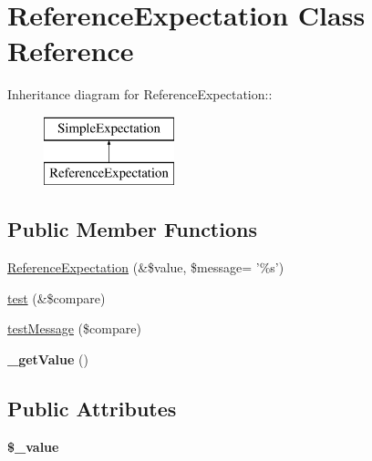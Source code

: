\hypertarget{class_reference_expectation}{
\section{ReferenceExpectation Class Reference}
\label{class_reference_expectation}
}
Inheritance diagram for ReferenceExpectation::\begin{figure}[H]
\begin{center}
\leavevmode
\includegraphics[height=2cm]{class_reference_expectation}
\end{center}
\end{figure}
\subsection*{Public Member Functions}
\begin{DoxyCompactItemize}
\item 
\hyperlink{class_reference_expectation_aa648fc5c33e580a6b661dbb85e8b5591}{ReferenceExpectation} (\&\$value, \$message= '\%s')
\item 
\hyperlink{class_reference_expectation_a919fb46086bf981f56b77c468c0bf4c4}{test} (\&\$compare)
\item 
\hyperlink{class_reference_expectation_a77c84b888b835ff1255f385d96f6f906}{testMessage} (\$compare)
\item 
\hypertarget{class_reference_expectation_a26b8af808a7ebea4e4b0c0153218e755}{
{\bfseries \_\-getValue} ()}
\label{class_reference_expectation_a26b8af808a7ebea4e4b0c0153218e755}

\end{DoxyCompactItemize}
\subsection*{Public Attributes}
\begin{DoxyCompactItemize}
\item 
\hypertarget{class_reference_expectation_aac0c359c7e0f7abb872b74fdc5681c94}{
{\bfseries \$\_\-value}}
\label{class_reference_expectation_aac0c359c7e0f7abb872b74fdc5681c94}

\end{DoxyCompactItemize}


